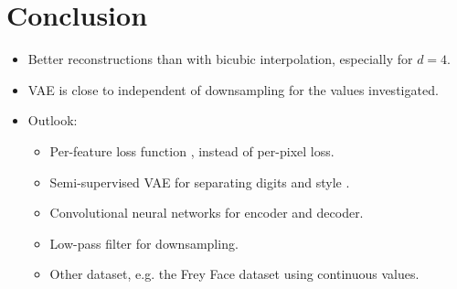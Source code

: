 \section{Conclusion} \label{sec:conclusion}

\begin{itemize}
	\item Better reconstructions than with bicubic interpolation, especially for $d = 4$.
	\item VAE is close to independent of downsampling for the values investigated.
	\item Outlook:
	\begin{itemize}
		\item Per-feature loss function \cite{Johnson16}, instead of per-pixel loss.
		\item Semi-supervised VAE for separating digits and style \cite{Kingma2014}.
		\item Convolutional neural networks for encoder and decoder.
		\item Low-pass filter for downsampling.
		\item Other dataset, e.g. the Frey Face dataset \cite{Frey} using continuous values. 
	\end{itemize}
\end{itemize}
